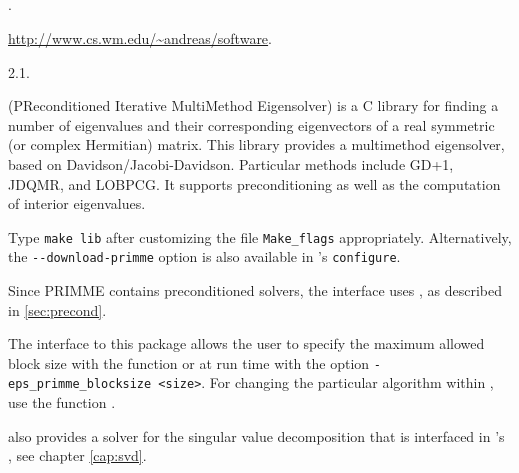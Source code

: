 \subsection*{\underline{\primme}}
	\begin{description}
	\setlength{\itemsep}{0pt}
	\item[References.]\citep{Stathopoulos:2010:PMS}.
	\item[Website.] \url{http://www.cs.wm.edu/~andreas/software}.
	\item[Version.] 2.1.
	\item[Summary.] \primme (PReconditioned Iterative MultiMethod Eigensolver) is a C library for finding a number of eigenvalues and their corresponding eigenvectors of a real symmetric (or complex Hermitian) matrix. This library provides a multimethod eigensolver, based on Davidson/Jacobi-Davidson. Particular methods include GD+1, JDQMR, and LOBPCG. It supports preconditioning as well as the computation of interior eigenvalues.
	\item[Installation.] Type \texttt{make lib} after customizing the file \texttt{Make\_flags} appropriately. Alternatively, the \texttt{-{}-download-primme} option is also available in \slepc's \texttt{configure}.
	\item[Specific options.] Since PRIMME contains preconditioned solvers, the \slepc interface uses , as described in \ref{sec:precond}.

The \slepc interface to this package allows the user to specify the maximum allowed block size with the function  or at run time with the option \Verb!-eps_primme_blocksize <size>!.
For changing the particular algorithm within \primme, use the function .

\primme also provides a solver for the singular value decomposition that is interfaced in \slepc's , see chapter \ref{cap:svd}.
	\end{description}

